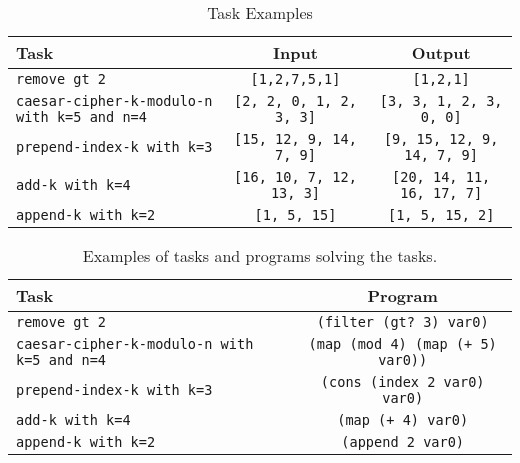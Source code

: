 \begin{table}[ht]
    \centering
    \begin{tabular}{|p{5cm}|c|c|}
        \hline
        \textbf{Task} & \textbf{Input} & \textbf{Output} \\\hline
        \texttt{remove gt 2} & \texttt{[1,2,7,5,1]} & \texttt{[1,2,1]} \\\hline
        \texttt{caesar-cipher-k-modulo-n with k=5 and n=4} & \texttt{[2, 2, 0, 1, 2, 3, 3]} & \texttt{[3, 3, 1, 2, 3, 0, 0]} \\\hline
        \texttt{prepend-index-k with k=3} & \texttt{[15, 12, 9, 14, 7, 9]} & \texttt{[9, 15, 12, 9, 14, 7, 9]} \\\hline
        \texttt{add-k with k=4} & \texttt{[16, 10, 7, 12, 13, 3]} & \texttt{[20, 14, 11, 16, 17, 7]} \\\hline
        \texttt{append-k with k=2} & \texttt{[1, 5, 15]} & \texttt{[1, 5, 15, 2]} \\\hline
    \end{tabular}
    \caption{Task Examples}
    \label{tab:task_ex}
\end{table}


\begin{table}[ht]
    \centering
    \begin{tabular}{|p{5cm}|c|}
        \hline
        \textbf{Task} & \textbf{Program} \\\hline
        \texttt{remove gt 2} & \texttt{(filter (gt? 3) var0)} \\\hline
        \texttt{caesar-cipher-k-modulo-n with k=5 and n=4} & \texttt{(map (mod 4) (map (+ 5) var0))} \\\hline
        \texttt{prepend-index-k with k=3} & \texttt{(cons (index 2 var0) var0)} \\\hline
        \texttt{add-k with k=4} & \texttt{(map (+ 4) var0)} \\\hline
        \texttt{append-k with k=2} & \texttt{(append 2 var0)} \\\hline
    \end{tabular}
    \caption{Examples of tasks and programs solving the tasks.}
    \label{tab:task_programs}
\end{table}


























